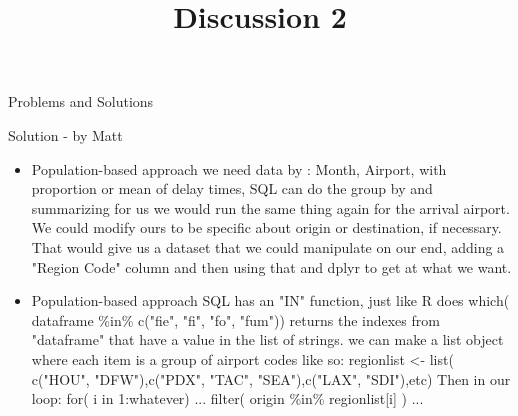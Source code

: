 \documentclass[12pt]{article}
\begin{document}
\title{Discussion 2}
\maketitle

Problems and Solutions 

Solution - by Matt

\begin{itemize}
\item Population-based approach  
\break
we need data by :
Month, Airport, with proportion or mean of delay times,
\break
SQL can do the group by and summarizing for us
\break
we would run the same thing again for the arrival airport. We could modify ours to be specific about origin or destination, if necessary. That would give us a dataset that we could manipulate on our end, adding a "Region Code" column and then using that and dplyr to get at what we want. 

\item Population-based approach  
\break
SQL has an "IN" function, just like R does
which( dataframe \%in\% c("fie", "fi", "fo", "fum")) returns the indexes from "dataframe" that have a value in the list of strings. 
\break
we can make a list object where each item is a group of airport codes like so:
\break
regionlist <- list(  c("HOU", "DFW"),c("PDX", "TAC", "SEA"),c("LAX", "SDI"),etc)
\break
Then in our loop:
\break
for( i in 1:whatever) {
    ...
    filter( origin \%in\% regionlist[i] )
    ...
}

\end{itemize}
\end{document}
